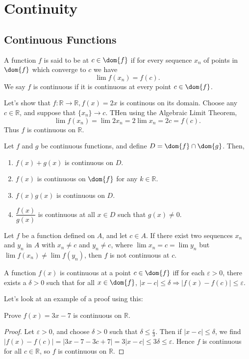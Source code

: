 \chapter{Continuity}

\section{Continuous Functions}
\begin{definition}
A function $f$ is said to be  at $c \in \dom{f}$ if for every sequence $x_n$ of points in $\dom{f}$ which converge to $c$ we have $$ \lim f(x_n) = f(c).$$ We say $f$ is continuous if it is continuous at every point $c \in \dom{f}$.
\end{definition}
\begin{example}
Let's show that $f: \mathbb{R} \rightarrow \mathbb{R}, f(x) = 2x$ is continous on its domain. Choose any $c \in \mathbb{R}$, and suppose that $\{x_n\} \rightarrow c$. THen using the Algebraic Limit Theorem, 
$$ \lim f(x_n) = \lim 2x_n = 2\lim x_n = 2c = f(c).$$ Thus $f$ is continuous on $\mathbb{R}$. 
\end{example}
\begin{theorem}
Let $f$ and $g$ be continuous functions, and define $D = \dom{f} \cap \dom{g}$. Then, 
\begin{enumerate}
\item $f(x) + g(x)$ is continuous on $D$. 
\item $f(x)$ is continuous on $\dom{f}$ for any $k \in \mathbb{R}$. 
\item $f(x)g(x)$ is continuous on $D$. 
\item $\dfrac{f(x)}{g(x)}$ is continuous at all $ x\in D$ such that $g(x) \neq 0$. 
\end{enumerate}
\end{theorem}
\begin{proposition}
Let $f$ be a function defined on $A$, and let $c \in A$. If there exist two sequences $x_n$ and $y_n$ in $A$ with $x_n \neq c$ and $y_n \neq c$, where $\lim x_n = c = \lim y_n$ but $\lim f(x_n) \neq \lim f(y_n)$, then $f$ is not continuous at $c$. 
\end{proposition}

\begin{theorem}
A function $f(x)$ is continuous at a point $c \in \dom{f}$ iff for each $\varepsilon > 0$, there exists a $\delta > 0$ such that for all $x \in \dom{f}$, $|x-c| \leq \delta \Rightarrow |f(x)-f(c)| \leq \varepsilon$. 
\end{theorem}
Let's look at an example of a proof using this:
\begin{example}
Prove $f(x) = 3x-7$ is continuous on $\mathbb{R}$. 
\end{example}
\begin{proof}
Let $\varepsilon >0$, and choose $\delta > 0$ such that $\delta \leq \frac{\varepsilon}{3}$. Then if $|x-c| \leq \delta$, we find $|f(x) - f(c)| = |3x -7 - 3c + 7| = 3|x-c| \leq 3\delta \leq \varepsilon$. Hence $f$ is continuous for all $c \in \mathbb{R}$, so $f$ is continuous on $\mathbb{R}$. 
\end{proof}

